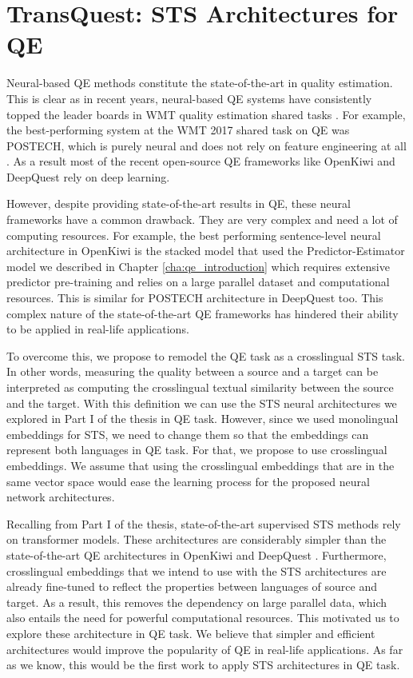 \chapter{\label{cha:qe_transquest}TransQuest: STS Architectures for QE}

Neural-based QE methods constitute the state-of-the-art in quality estimation. This is clear as in recent years, neural-based QE systems have consistently topped the leader boards in WMT quality estimation shared tasks  \autocite{kepler-etal-2019-openkiwi}. For example, the best-performing system at the WMT 2017 shared task on QE was \textsc{POSTECH}, which is purely neural and does not rely on feature engineering at all \autocite{kim-etal-2017-predictor}. As a result most of the recent open-source QE frameworks like OpenKiwi \autocite{kepler-etal-2019-openkiwi} and DeepQuest  \autocite{ive-etal-2018-deepquest} rely on deep learning. 

However, despite providing state-of-the-art results in QE, these neural frameworks have a common drawback. They are very complex and need a lot of computing resources. For example, the best performing sentence-level neural architecture in OpenKiwi \autocite{kepler-etal-2019-openkiwi} is the stacked model that used the Predictor-Estimator model we described in Chapter \ref{cha:qe_introduction} which requires extensive predictor pre-training and relies on a large parallel dataset and computational resources. This is similar for \textsc{POSTECH} architecture in DeepQuest \autocite{ive-etal-2018-deepquest} too. This complex nature of the state-of-the-art QE frameworks has hindered their ability to be applied in real-life applications. 

To overcome this, we propose to remodel the QE task as a crosslingual STS task. In other words, measuring the quality between a source and a target can be interpreted as computing the crosslingual textual similarity between the source and the target. With this definition we can use the STS neural architectures we explored in Part I of the thesis in QE task. However, since we used monolingual embeddings for STS, we need to change them so that the embeddings can represent both languages in QE task. For that, we propose to use crosslingual embeddings. We assume that using the crosslingual embeddings that are in the same vector space would ease the learning process for the proposed neural network architectures. 

Recalling from Part I of the thesis, state-of-the-art supervised STS methods rely on transformer models. These architectures are considerably simpler than the state-of-the-art QE architectures in OpenKiwi \autocite{kepler-etal-2019-openkiwi} and DeepQuest  \autocite{ive-etal-2018-deepquest}. Furthermore, crosslingual embeddings that we intend to use with the STS architectures are already fine-tuned to reflect the properties between languages of source and target. As a result, this removes the dependency on large parallel data, which also entails the need for powerful computational resources. This motivated us to explore these architecture in QE task. We believe that simpler and efficient architectures would improve the popularity of QE in real-life applications. As far as we know, this would be the first work to apply STS architectures in QE task.

